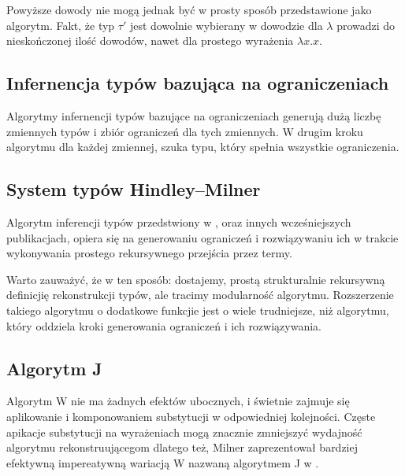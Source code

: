 \documentclass{article}
\begin{document}
Powyższe dowody nie mogą jednak być w prosty sposób przedstawione jako algorytm. Fakt, że typ $\tau'$ jest dowolnie wybierany w dowodzie dla $\lambda$ prowadzi do nieskończonej ilość dowodów, nawet dla prostego wyrażenia $\lambda x.x$.
\subsection{Infernencja typów bazująca na ograniczeniach}
Algorytmy infernencji typów bazujące na ograniczeniach generują dużą liczbę zmiennych typów i zbiór ograniczeń dla tych zmiennych. W drugim kroku algorytmu dla każdej zmiennej, szuka typu, który spełnia wszystkie ograniczenia.
\subsection{System typów Hindley–Milner}
Algorytm inferencji typów przedstwiony w \cite{Milner__1978}, oraz innych wcześniejszych publikacjach, opiera się na generowaniu ograniczeń i rozwiązywaniu ich w trakcie wykonywania prostego rekursywnego przejścia przez termy.

Warto zauważyć, że w ten sposób: dostajemy, prostą strukturalnie rekursywną definicjię rekonstrukcji typów, ale tracimy modularność algorytmu. Rozszerzenie takiego algorytmu o dodatkowe funkcjie jest o wiele trudniejsze, niż algorytmu, który oddziela kroki generowania ograniczeń i ich rozwiązywania.

\subsection{Algorytm J}
Algorytm W nie ma żadnych efektów ubocznych, i świetnie zajmuje się aplikowanie i komponowaniem substytucji w odpowiedniej kolejności. Częste apikacje substytucji na wyrażeniach mogą znacznie zmniejszyć wydajność algorytmu rekonstruującegom dlatego też, Milner zaprezentował bardziej efektywną impereatywną wariacją W nazwaną algorytmem J w \cite{Milner__1978}.
\end{document}
